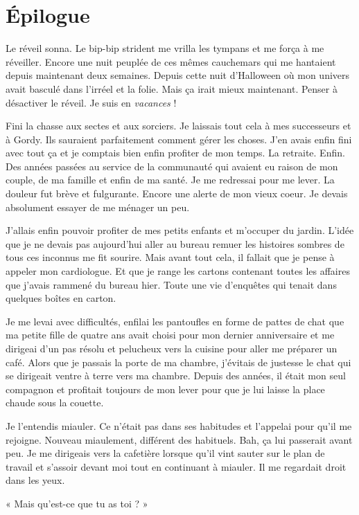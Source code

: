 \chapter[Épilogue]{Épilogue}
Le réveil sonna. Le bip-bip strident me vrilla les tympans et me força à me réveiller. Encore une nuit peuplée de ces 
mêmes cauchemars qui me hantaient depuis maintenant deux semaines. Depuis cette nuit d'Halloween où mon univers 
avait basculé dans l'irréel et la folie. Mais ça irait mieux maintenant. Penser à désactiver le réveil. Je suis en 
\emph{vacances} !

Fini la chasse aux sectes et aux sorciers. Je laissais tout cela à mes successeurs et à Gordy. Ils sauraient 
parfaitement comment gérer les choses. J'en avais enfin fini avec tout ça et je comptais bien enfin profiter de mon 
temps. La retraite. Enfin. Des années passées au service de la communauté qui avaient eu raison de mon couple, de ma 
famille et enfin de ma santé. Je me redressai pour me lever. La douleur fut brève et fulgurante. Encore une alerte 
de mon vieux coeur. Je devais absolument essayer de me ménager un peu. 

J'allais enfin pouvoir profiter de mes petits enfants et m'occuper du jardin. L'idée que je ne devais pas aujourd'hui 
aller au bureau remuer les histoires sombres de tous ces inconnus me fit sourire. Mais avant tout cela, il fallait 
que je pense à appeler mon cardiologue. Et que je range les cartons contenant toutes les affaires que j'avais rammené du 
bureau hier. Toute une vie d'enquêtes qui tenait dans quelques boîtes en carton.

Je me levai avec difficultés, enfilai les pantoufles en forme de pattes de chat que ma petite fille de quatre ans avait 
choisi pour mon dernier anniversaire et me dirigeai d'un pas résolu et pelucheux vers la cuisine pour aller me préparer
un café. Alors que je passais la porte de ma chambre, j'évitais de justesse le chat qui se dirigeait ventre à terre vers 
ma chambre. Depuis des années, il était mon seul compagnon et profitait toujours de mon lever pour que je lui laisse 
la place chaude sous la couette.

Je l'entendis miauler. Ce n'était pas dans ses habitudes et l'appelai pour qu'il me rejoigne. Nouveau miaulement, 
différent des habituels. Bah, ça lui passerait avant peu. Je me dirigeais vers la cafetière lorsque qu'il vint sauter 
sur le plan de travail et s'assoir devant moi tout en continuant à miauler. Il me regardait droit dans les yeux.

« Mais qu'est-ce que tu as toi ? »

